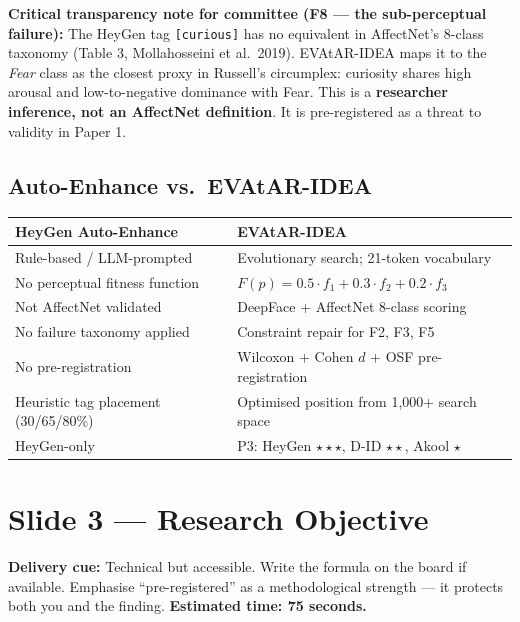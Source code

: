 \documentclass[12pt,a4paper]{article}
\begin{document}
\begin{warnbox}
\textbf{Critical transparency note for committee (F8 — the sub-perceptual failure):}
The HeyGen tag \texttt{[curious]} has no equivalent in AffectNet's 8-class taxonomy (Table 3,
Mollahosseini et al.\ 2019). EVAtAR-IDEA maps it to the \textit{Fear} class as the closest
proxy in Russell's circumplex: curiosity shares high arousal and low-to-negative dominance with
Fear. This is a \textbf{researcher inference, not an AffectNet definition}. It is pre-registered
as a threat to validity in Paper 1.
\end{warnbox}

\subsection{Auto-Enhance vs.\ EVAtAR-IDEA}

\begin{center}
\begin{tabular}{@{}p{6cm}p{7cm}@{}}
\toprule
\textbf{HeyGen Auto-Enhance} & \textbf{EVAtAR-IDEA} \\
\midrule
Rule-based / LLM-prompted & Evolutionary search; 21-token vocabulary \\
No perceptual fitness function & $F(p) = 0.5 \cdot f_1 + 0.3 \cdot f_2 + 0.2 \cdot f_3$ \\
Not AffectNet validated & DeepFace + AffectNet 8-class scoring \\
No failure taxonomy applied & Constraint repair for F2, F3, F5 \\
No pre-registration & Wilcoxon + Cohen $d$ + OSF pre-registration \\
Heuristic tag placement (30/65/80\%) & Optimised position from 1,000+ search space \\
HeyGen-only & P3: HeyGen $\star\star\star$, D-ID $\star\star$, Akool $\star$ \\
\bottomrule
\end{tabular}
\end{center}

\newpage
\section{Slide 3 --- Research Objective}

\begin{cuebox}
\textbf{Delivery cue:} Technical but accessible. Write the formula on the board if available.
Emphasise ``pre-registered'' as a methodological strength --- it protects both you and the finding.
\textbf{Estimated time: 75 seconds.}
\end{cuebox}
\end{document}
